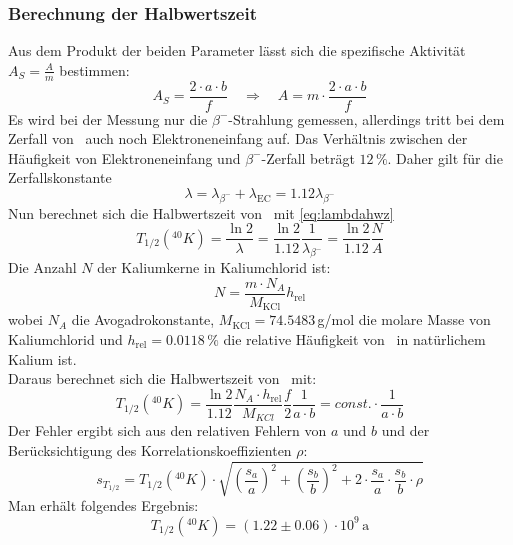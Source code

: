 \subsubsection{Berechnung der Halbwertszeit}
Aus dem Produkt der beiden Parameter lässt sich die spezifische Aktivität $A_S = \frac{A}{m}$ bestimmen:
\begin{equation}
  A_S = \frac{2 \cdot a \cdot b}{f} \quad \Rightarrow \quad A = m \cdot \frac{2 \cdot a \cdot b}{f}
\end{equation}
Es wird bei der Messung nur die $\beta^-$-Strahlung gemessen, allerdings tritt bei dem Zerfall von \kalium\, auch noch Elektroneneinfang auf. 
Das Verhältnis zwischen der Häufigkeit von Elektroneneinfang und $\beta^-$-Zerfall beträgt $12\,\%$. Daher gilt für die Zerfallskonstante
\begin{equation}
  \lambda = \lambda_{\beta^-} + \lambda_{\text{EC}} = 1.12 \lambda_{\beta^-}
\end{equation}
Nun berechnet sich die Halbwertszeit von \kalium\, mit \autoref{eq:lambdahwz}
\begin{equation}
  T_{1/2}({}^{40}K) = \frac{\ln 2}{\lambda} = \frac{\ln 2}{1.12} \frac{1}{\lambda_{\beta^-}} = \frac{\ln 2}{1.12} \frac{N}{A}
\end{equation}
Die Anzahl $N$ der Kaliumkerne in Kaliumchlorid ist:
\begin{equation}
  N = \frac{m \cdot N_A}{M_{\text{KCl}}} h_{\text{rel}}
\end{equation}
wobei $N_A$ die Avogadrokonstante, $M_{\text{KCl}}=74.5483\,$g/mol die molare Masse von Kaliumchlorid und $h_{\text{rel}}=0.0118\,\%$ die 
relative Häufigkeit von \kalium\, in natürlichem Kalium ist. \\
Daraus berechnet sich die Halbwertszeit von \kalium\, mit:
\begin{equation}
  T_{1/2} \left( {}^{40} K \right)  = \frac{\ln 2}{1.12} \frac{N_A \cdot h_{\text{rel}}}{M_{KCl}} \frac{f}{2} \frac{1}{a \cdot b} = const. \cdot \frac{1}{a \cdot b}
\end{equation}
Der Fehler ergibt sich aus den relativen Fehlern von $a$ und $b$ und der Berücksichtigung des Korrelationskoeffizienten $\rho$:
\begin{equation}
  s_{T_{1/2}} = T_{1/2} \left( {}^{40} K \right) \cdot \sqrt{ \left( \frac{s_a}{a} \right)^2 + \left( \frac{s_b}{b} \right)^2 + 2 \cdot \frac{s_a}{a} \cdot \frac{s_b}{b} \cdot \rho   }
\end{equation}
Man erhält folgendes Ergebnis:
\begin{equation}
  T_{1/2} \left( {}^{40} K \right) = (1.22 \pm 0.06) \cdot 10^9\,\text{a}  
\end{equation}

